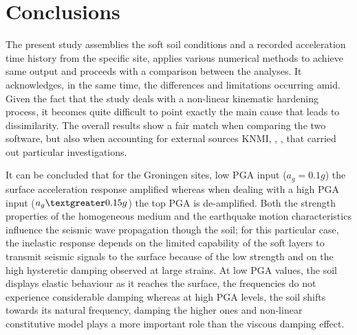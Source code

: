 	\section{Conclusions}
	The present study assemblies the soft soil conditions and a recorded acceleration time history from the specific site, applies various numerical methods to achieve same output and proceeds with a comparison between the analyses. It acknowledges, in the same time, the differences and limitations occurring amid. Given the fact that the study deals with a non-linear kinematic hardening process, it becomes quite difficult to point exactly the main cause that leads to dissimilarity. The overall results show a fair match when comparing the two software, but also when accounting for external sources KNMI, \cite{dost2012monitoring}, \cite{dost2004scaling}, \cite{dost2013august} that carried out particular investigations. 
		
	It can be concluded that for the Groningen sites, low PGA input ($a_g=0.1g$) the surface acceleration response amplified whereas when dealing with a high PGA input ($a_g\textgreater0.15g$) the top PGA is de-amplified. Both the strength properties of the homogeneous medium and the earthquake motion characteristics influence the seismic wave propagation though the soil; for this particular case, the inelastic response depends on the limited capability of the soft layers to transmit seismic signals to the surface because of the low strength and on the high hysteretic damping observed at large strains. At low PGA values, the soil displays elastic behaviour as it reaches the surface, the frequencies do not experience considerable damping whereas at high PGA levels, the soil shifts towards its natural frequency, damping the higher ones and non-linear constitutive model plays a more important role than the viscous damping effect.